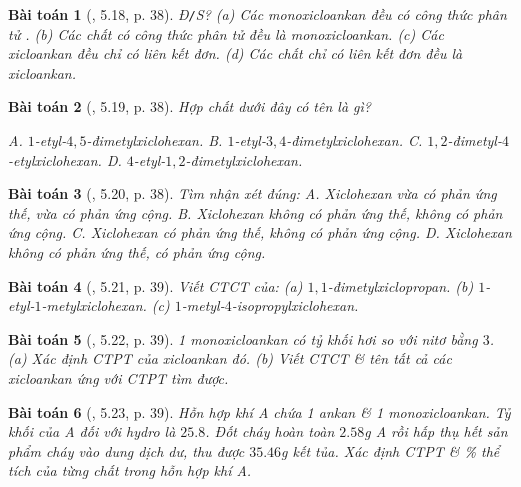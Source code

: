 \documentclass{article}
\newtheorem{baitoan}{Bài toán}
\begin{document}
\begin{baitoan}[\cite{SBT_Hoa_Hoc_11_co_ban}, 5.18, p. 38]
	\emph{Đ\texttt{/}S?} (a) Các monoxicloankan đều có công thức phân tử \emph{}. (b) Các chất có công thức phân tử \emph{} đều là monoxicloankan. (c) Các xicloankan đều chỉ có liên kết đơn. (d) Các chất chỉ có liên kết đơn đều là xicloankan.
\end{baitoan}

\begin{baitoan}[\cite{SBT_Hoa_Hoc_11_co_ban}, 5.19, p. 38]
	Hợp chất dưới đây có tên là gì?
	\begin{center}
	\end{center}
	{\sf A.} $1$-etyl-$4,5$-đimetylxiclohexan. {\sf B.} $1$-etyl-$3,4$-đimetylxiclohexan. {\sf C.} $1,2$-đimetyl-$4$-etylxiclohexan. {\sf D.} $4$-etyl-$1,2$-đimetylxiclohexan.	
\end{baitoan}

\begin{baitoan}[\cite{SBT_Hoa_Hoc_11_co_ban}, 5.20, p. 38]
	Tìm nhận xét đúng: {\sf A.} Xiclohexan vừa có phản ứng thế, vừa có phản ứng cộng. {\sf B.} Xiclohexan không có phản ứng thế, không có phản ứng cộng. {\sf C.} Xiclohexan có phản ứng thế, không có phản ứng cộng. {\sf D.} Xiclohexan không có phản ứng thế, có phản ứng cộng.
\end{baitoan}

\begin{baitoan}[\cite{SBT_Hoa_Hoc_11_co_ban}, 5.21, p. 39]
	Viết CTCT của: (a) $1,1$-đimetylxiclopropan. (b) $1$-etyl-$1$-metylxiclohexan. (c) $1$-metyl-$4$-isopropylxiclohexan.
\end{baitoan}

\begin{baitoan}[\cite{SBT_Hoa_Hoc_11_co_ban}, 5.22, p. 39]
	1 monoxicloankan có tỷ khối hơi so với nitơ bằng $3$. (a) Xác định CTPT của xicloankan đó. (b) Viết CTCT \& tên tất cả các xicloankan ứng với CTPT tìm được.
\end{baitoan}

\begin{baitoan}[\cite{SBT_Hoa_Hoc_11_co_ban}, 5.23, p. 39]
	Hỗn hợp khí A chứa 1 ankan \& 1 monoxicloankan. Tỷ khối của A đối với hydro là $25.8$. Đốt cháy hoàn toàn $2.58$\emph{g} A rồi hấp thụ hết sản phẩm cháy vào dung dịch \emph{} dư, thu được $35.46$\emph{g} kết tủa. Xác định CTPT \& \% thể tích của từng chất trong hỗn hợp khí A.
\end{baitoan}
\end{document}
